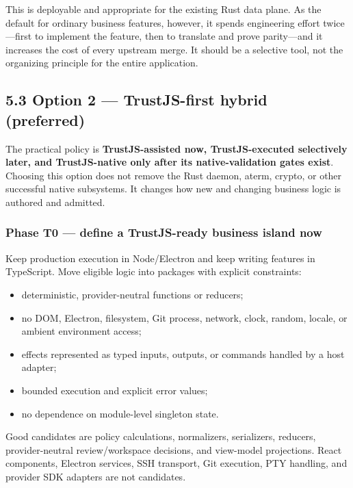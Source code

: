 \documentclass[
  10pt,
  letterpaper,
]{article}
\providecommand{\tightlist}{%
  \setlength{\itemsep}{0pt}\setlength{\parskip}{0pt}}
\begin{document}
This is deployable and appropriate for the existing Rust data plane. As
the default for ordinary business features, however, it spends
engineering effort twice---first to implement the feature, then to
translate and prove parity---and it increases the cost of every upstream
merge. It should be a selective tool, not the organizing principle for
the entire application.

\subsection{5.3 Option 2 --- TrustJS-first hybrid
(preferred)}\label{53-option-2--trustjs-first-hybrid-preferred}

The practical policy is \textbf{TrustJS-assisted now, TrustJS-executed
selectively later, and TrustJS-native only after its native-validation
gates exist}. Choosing this option does not remove the Rust daemon,
aterm, crypto, or other successful native subsystems. It changes how new
and changing business logic is authored and admitted.

\subsubsection{Phase T0 --- define a TrustJS-ready business island
now}\label{phase-t0--define-a-trustjs-ready-business-island-now}

Keep production execution in Node/Electron and keep writing features in
TypeScript. Move eligible logic into packages with explicit constraints:

\begin{itemize}
\tightlist
\item
  deterministic, provider-neutral functions or reducers;
\item
  no DOM, Electron, filesystem, Git process, network, clock, random,
  locale, or ambient environment access;
\item
  effects represented as typed inputs, outputs, or commands handled by a
  host adapter;
\item
  bounded execution and explicit error values;
\item
  no dependence on module-level singleton state.
\end{itemize}

Good candidates are policy calculations, normalizers, serializers,
reducers, provider-neutral review/workspace decisions, and view-model
projections. React components, Electron services, SSH transport, Git
execution, PTY handling, and provider SDK adapters are not candidates.
\end{document}
